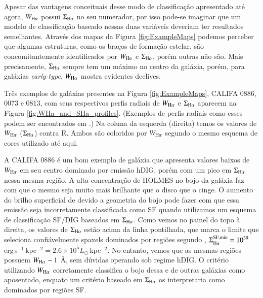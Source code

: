 Apesar das vantagens conceituais desse modo de classificação apresentado até agora, $W_{\Ha}$ possui $\Sigma_{\Ha}$ no seu numerador, por isso pode-se imaginar que um modelo de classificação baseado nessas duas variáveis deveriam ter resultados semelhantes. Através dos mapas da Figura \ref{fig:ExampleMaps} podemos perceber que algumas estruturas, como os braços de formação estelar, são concomitantemente identificados por $W_{\Ha}$ e $\Sigma_{\Ha}$, porém outras não são. Mais precisamente, $\Sigma_{\Ha}$ sempre tem um máximo no centro da galáxia, porém, para galáxias {\em early-type}, $W_{\Ha}$ mostra evidentes declives.

Três exemplos de galáxias presentes na Figura \ref{fig:ExampleMaps}, CALIFA 0886, 0073 e 0813, com seus respectivos perfis radiais de $W_{\Ha}$ e $\Sigma_{\Ha}$ aparecem na Figura \ref{fig:WHa_and_SHa_profiles}. (Exemplos de perfis radiais como esses podem ser encontrados em \citealt{Papaderos.etal.2013, Belfiore.etal.2016, Belfiore.etal.2017, Gomes.etal.2016b, GonzalezDelgado.etal.2016a}.) Na coluna da esquerda (direita) temos os valores de $W_{\Ha}$ ($\Sigma_{\Ha}$) contra R. Ambos são coloridos por $W_{\Ha}$ segundo o mesmo esquema de cores utilizado até aqui.

A CALIFA 0886 é um bom exemplo de galáxia que apresenta valores baixos de $W_{\Ha}$ em seu centro dominado por emissão hDIG, porém com um pico em $\Sigma_{\Ha}$ nessa mesma região. A alta concentração de HOLMES no bojo da galáxia faz com que o mesmo seja muito mais brilhante que o disco que o cinge. O aumento do brilho superficial de \Ha devido a geometria do bojo pode fazer com que essa emissão seja incorretamente classificada como SF quando utilizamos um esquema de classificação SF/DIG baseados em $\Sigma_{\Ha}$. Como vemos no painel do topo à direita, os valores de $\Sigma_{\Ha}$ estão acima da linha pontilhada, que marca o limite que seleciona confiávelmente spaxels dominados por regiões \hii segundo \citet{Zhang.etal.2017a}, $\Sigma^{\rm SF,min}_{\Ha} = 10^{39}$ erg$\,$s$^{-1}\,$kpc$^{-2} =  2.6 \times 10^{5} L_\odot\,$kpc$^{-2}$. No entanto, vemos que as mesmas regiões possuem $W_{\Ha} \sim 1$ \AA, sem dúvidas operando sob regime hDIG. O critério utilizando $W_{\Ha}$ corretamente classifica o bojo dessa e de outras galáxias como aposentado, enquato um critério baseado em $\Sigma_{\Ha}$ os interpretaria como dominados por regiões SF.

